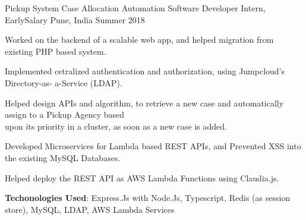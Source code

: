 \begin{cventries}

  \cventry
  {Pickup System Case Allocation Automation}
  {Software Developer Intern, EarlySalary}
  {Pune, India}
  {Summer 2018}
  {
    \begin{cvitems}
	\item Worked on the backend of a scalable web app, and helped migration from existing PHP based system.
	\item Implemented cetralized authentication and authorization, using Jumpcloud’s Directory-as-
a-Service (LDAP).
\item Helped design APIs and algorithm, to retrieve a new case and automatically assign to a Pickup Agency based \\ upon its priority in a cluster, as soon as a new case is added.
\item Developed Microservices for Lambda based REST APIs, and Prevented XSS into the existing MySQL Databases.
\item Helped deploy the REST API as AWS Lambda Functions using Claudia.js.
\item \textbf{Techonologies Used}: Express.Js with Node.Js, Typescript, Redis (as session store), MySQL,
LDAP, AWS Lambda Services
    \end{cvitems}
  }

\end{cventries}
